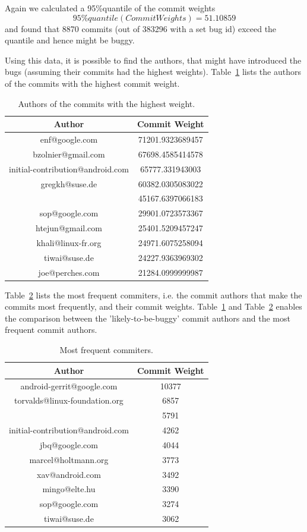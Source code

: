 \documentclass[a4paper,11pt]{article}
\begin{document}
Again we calculated a 95\%quantile of the commit weights
\[95\%quantile(CommitWeights) = 51.10859\] and found that 8870 commits (out of 383296 with a set bug id) exceed the quantile and  hence might be buggy.

Using this data, it is possible to find the authors, that might have introduced the bugs (assuming their commits had the highest weights). Table~\ref{tbl:bad_authors} lists the authors of the commits with the highest commit weight.

\begin{table}[ht!]
\centering
\begin{tabular}{|c|c|}
\hline
Author & Commit Weight\tabularnewline
\hline
\hline
enf@google.com & 71201.9323689457\tabularnewline
\hline
bzolnier@gmail.com & 67698.4585414578\tabularnewline
\hline
initial-contribution@android.com & 65777.331943003\tabularnewline
\hline
gregkh@suse.de & 60382.0305083022\tabularnewline
\hline
 & 45167.6397066183\tabularnewline
\hline
sop@google.com & 29901.0723573367\tabularnewline
\hline
htejun@gmail.com & 25401.5209457247\tabularnewline
\hline
khali@linux-fr.org & 24971.6075258094\tabularnewline
\hline
tiwai@suse.de & 24227.9363969302\tabularnewline
\hline
joe@perches.com & 21284.0999999987\tabularnewline
\hline
\end{tabular}
\caption{Authors of the commits with the highest weight.}
\label{tbl:bad_authors}
\end{table}

Table~\ref{tbl:fast_authors} lists the most frequent commiters, i.e. the commit authors that make the commits most frequently, and their commit weights. Table~\ref{tbl:bad_authors} and Table~\ref{tbl:fast_authors} enables the comparison between the 'likely-to-be-buggy' commit authors and the most frequent commit authors.

\begin{table}[ht!]
\centering
\begin{tabular}{|c|c|}
\hline
Author & Commit Weight\tabularnewline
\hline
\hline
android-gerrit@google.com & 10377\tabularnewline
\hline
torvalds@linux-foundation.org & 6857\tabularnewline
\hline
 & 5791\tabularnewline
\hline
initial-contribution@android.com & 4262\tabularnewline
\hline
jbq@google.com & 4044\tabularnewline
\hline
marcel@holtmann.org & 3773\tabularnewline
\hline
xav@android.com & 3492\tabularnewline
\hline
mingo@elte.hu & 3390\tabularnewline
\hline
sop@google.com & 3274\tabularnewline
\hline
tiwai@suse.de & 3062\tabularnewline
\hline
\hline
\end{tabular}
\caption{Most frequent commiters.}
\label{tbl:fast_authors}
\end{table}
\end{document}
